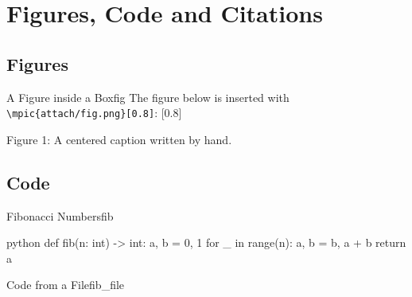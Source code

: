 \chapter{Figures, Code and Citations}
%
\section{Figures}
%
\begin{exbox}{A Figure inside a Box}{fig}
The figure below is inserted with \verb|\mpic{attach/fig.png}[0.8]|:
[0.8]
{\centering\small Figure 1: A centered caption written by hand.\par}
\end{exbox}
%
\section{Code}
%
\begin{codebox}{Fibonacci Numbers}{fib}
\begin{amzcode}{python}
def fib(n: int) -> int:
    a, b = 0, 1
    for _ in range(n):
        a, b = b, a + b
    return a
\end{amzcode}
\end{codebox}
%
\begin{codebox}{Code from a File}{fib_file}
\end{codebox}
%
